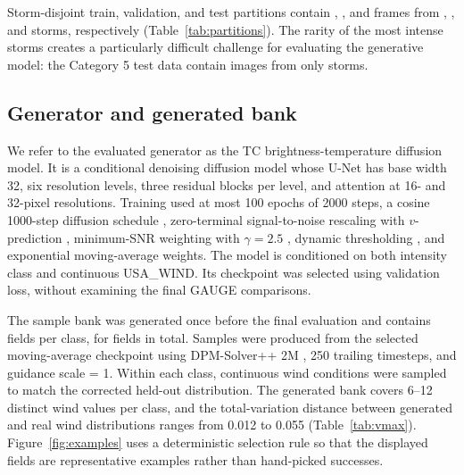 \documentclass[gmd, manuscript]{copernicus}
\begin{document}
Storm-disjoint train, validation, and test partitions contain
\TrainingFrames{}, \ValidationFrames{}, and \TestFrames{} frames from
\TrainingStorms{}, \ValidationStorms{}, and \TestStorms{} storms, respectively
(Table~\ref{tab:partitions}).
The rarity of the most intense storms creates a particularly difficult challenge for
evaluating the generative model: the Category 5 test data contain \CfiveFrames{}
images from only \CfiveStorms{} storms.

\begin{table}[t]
\caption{Storm-disjoint TC partitions by intensity class. Storm counts are the number
of storms contributing at least one frame to the class and therefore do not sum to
the split total, as one storm can cross several classes.}
\label{tab:partitions}
\centering

\end{table}

\subsection{Generator and generated bank}

We refer to the evaluated generator as the TC brightness-temperature diffusion model.
It is a conditional
denoising diffusion model \citep{Ho2020,Karras2022} whose U-Net has base width 32, six
resolution levels, three residual blocks per level, and attention at 16- and 32-pixel
resolutions. Training used at most 100 epochs of 2000 steps, a cosine 1000-step
diffusion schedule \citep{Nichol2021}, zero-terminal signal-to-noise rescaling with
\(v\)-prediction \citep{Lin2024}, minimum-SNR weighting with \(\gamma=2.5\)
\citep{Hang2023}, dynamic thresholding \citep{Saharia2022}, and exponential
moving-average weights. The model is conditioned on both intensity class and
continuous USA\_WIND. Its checkpoint was selected using validation loss, without
examining the final GAUGE comparisons.

The sample bank was generated once before the final evaluation and contains
\GeneratedPerClass{} fields per class, for \GeneratedTotal{} fields in total.
Samples were produced from the selected moving-average checkpoint using DPM-Solver++
2M \citep{Lu2023}, 250 trailing timesteps, and guidance scale = 1. Within each
class, continuous wind conditions were sampled to match the corrected held-out
distribution. The generated bank covers 6--12 distinct wind values per class, and the
total-variation distance between generated and real wind distributions ranges from
0.012 to 0.055 (Table~\ref{tab:vmax}). Figure~\ref{fig:examples} uses a deterministic
selection rule so that the displayed fields are representative examples rather than
hand-picked successes.
\end{document}
